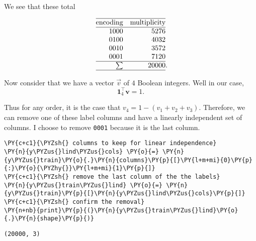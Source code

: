     \begin{center}
    \end{center}
    { \hspace*{\fill} \\}
    
    We see that these total

\[
    \begin{array}{@{}rr@{}}
    \hline
        \text{encoding} & \text{multiplicity}
    \\
    \hline
        1000            &  5276
    \\
        0100            &  4032
    \\
        0010            &  3572
    \\
        0001            &  7120
    \\
    \hline
        \sum            & 20000\rlap.
    \\
    \hline
    \end{array}
\]

Now consider that we have a vector \(\vec{v}\) of \(4\) Boolean
integers. Well in our case, \[
    \mathbf{1}_4^\intercal
    \mathbf{v}
    = 1.
\]

Thus for any order, it is the case that \(v_4 = 1 - (v_1 + v_2 + v_3)\).
Therefore, we can remove one of these label columns and have a linearly
independent set of columns. I choose to remove \texttt{0001} because it
is the last column.

    \begin{tcolorbox}[breakable, size=fbox, boxrule=1pt, pad at break*=1mm,colback=cellbackground, colframe=cellborder]
\begin{Verbatim}[commandchars=\\\{\}]
\PY{c+c1}{\PYZsh{} columns to keep for linear independence}
\PY{n}{y\PYZus{}lind\PYZus{}cols} \PY{o}{=} \PY{n}{y\PYZus{}train}\PY{o}{.}\PY{n}{columns}\PY{p}{[}\PY{l+m+mi}{0}\PY{p}{:}\PY{o}{\PYZhy{}}\PY{l+m+mi}{1}\PY{p}{]}
\PY{c+c1}{\PYZsh{} remove the last column of the the labels}
\PY{n}{y\PYZus{}train\PYZus{}lind} \PY{o}{=} \PY{n}{y\PYZus{}train}\PY{p}{[}\PY{n}{y\PYZus{}lind\PYZus{}cols}\PY{p}{]}
\PY{c+c1}{\PYZsh{} confirm the removal}
\PY{n+nb}{print}\PY{p}{(}\PY{n}{y\PYZus{}train\PYZus{}lind}\PY{o}{.}\PY{n}{shape}\PY{p}{)}
\end{Verbatim}
\end{tcolorbox}

    \begin{Verbatim}[commandchars=\\\{\}]
(20000, 3)
    \end{Verbatim}

